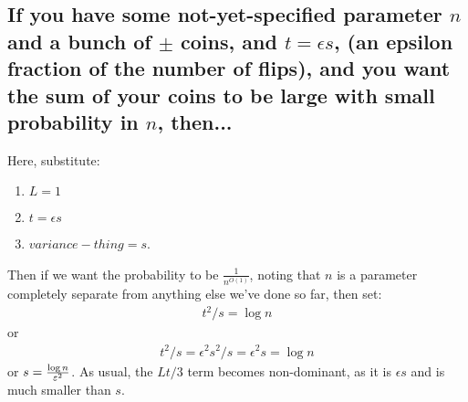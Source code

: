   \subsection{If you have some not-yet-specified parameter $n$ and a bunch of $\pm$ coins, and $t = \epsilon s$, (an epsilon fraction of the number of flips), and you want the sum of your coins to be large with small probability in $n$, then...}
  Here, substitute:
  \begin{enumerate}
    \item $L=1$
    \item $t = \epsilon s$
    \item $variance-thing = s$.
  \end{enumerate}
  Then if we want the probability to be $\frac{1}{n^{O(1)}}$, noting that $n$ is a parameter completely separate from anything else we've done so far, then set:
  \begin{align}
    t^2/s = \log n
  \end{align}
  or
  \begin{align}
    t^2/s = \epsilon^2 s^2 / s = \epsilon^2 s = \log n
  \end{align}
  or $s = \frac{\log n}{\varepsilon^2}$. As usual, the $Lt/3$ term becomes non-dominant, as it is $\epsilon s$ and is much smaller than $s$.



